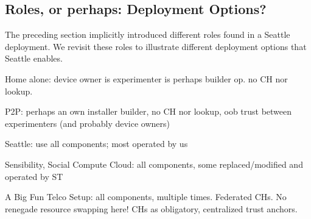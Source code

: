 \subsection{Roles, or perhaps: Deployment Options?}

The preceding section implicitly introduced different roles found in
a Seattle deployment. We revisit these roles to illustrate different
deployment options that Seattle enables.

Home alone: device owner is experimenter is perhaps builder op.
no CH nor lookup.

P2P: perhaps an own installer builder, no CH nor lookup,
oob trust between experimenters (and probably device owners)

Seattle: use all components; most operated by us

Sensibility, Social Compute Cloud: all components, some replaced/modified
and operated by ST

A Big Fun Telco Setup: all components, multiple times. Federated CHs.
No renegade resource swapping here! CHs as obligatory, centralized trust
anchors.
